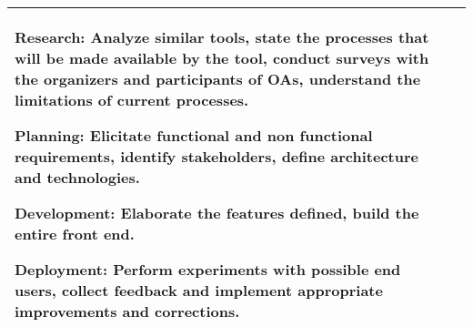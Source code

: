 \begin{table}[!htb]
\begin{tabular}{l|p{11cm}}
    \begin{inparaenum}[(i)]
      \item Research: Analyze similar tools, state the processes that will be made available by the tool, conduct surveys with the organizers and participants of \acp{OA}, understand the limitations of current processes.
      \item Planning: Elicitate functional and non functional requirements, identify stakeholders, define architecture and technologies.
      \item Development: Elaborate the features defined, build the entire front end.
      \item Deployment: Perform experiments with possible end users, collect feedback and implement appropriate improvements and corrections.
    \end{inparaenum}                                                                                                         \\
    \toprule
  \end{tabular}
\end{table}